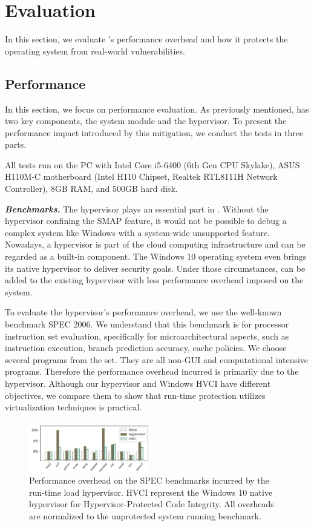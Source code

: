 
\section{Evaluation}
\label{sec:ktoctou-evaluation}

In this section, we evaluate \name's performance overhead and how it protects the operating system from real-world vulnerabilities.


\subsection{Performance}
In this section, we focus on performance evaluation.
As previously mentioned, \name has two key components, the system module and the hypervisor. To present the performance impact introduced by this mitigation, we conduct the tests in three parts. 

All tests run on the PC with Intel Core i5-6400 (6th Gen CPU Skylake), ASUS H110M-C motherboard (Intel H110 Chipset, Realtek RTL8111H Network Controller), 8GB RAM, and 500GB hard disk.

\textbf{\textit{Benchmarks.}} The hypervisor plays an essential part in \name. Without the hypervisor confining the SMAP feature, it would not be possible to debug a complex system like Windows with a system-wide unsupported feature. Nowadays, a hypervisor is part of the cloud computing infrastructure and can be regarded as a built-in component. The Windows 10 operating system even brings its native hypervisor to deliver security goals. Under those circumstances, \name can be added to the existing hypervisor with less performance overhead imposed on the system. 


To evaluate the hypervisor's performance overhead, we use the well-known benchmark SPEC 2006. We understand that this benchmark is for processor instruction set evaluation, specifically for microarchitectural aspects, such as instruction execution, branch prediction accuracy, cache policies. We choose several programs from the set. They are all non-GUI and computational intensive programs. Therefore the performance overhead incurred is primarily due to the hypervisor. Although our hypervisor and Windows HVCI have different objectives, we compare them to show that run-time protection utilizes virtualization techniques is practical.

\begin{figure}[th]
  \includegraphics[width=0.47\textwidth]{figures/benchmark3}
  \centering
  \caption{Performance overhead on the SPEC benchmarks incurred by the run-time load hypervisor. HVCI represent the Windows 10 native hypervisor for Hypervisor-Protected Code Integrity. All overheads are normalized to the unprotected system running benchmark.}
  \label{fig:ktoctou-benchmark}
\end{figure}


